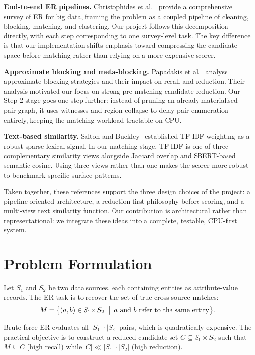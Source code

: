 \documentclass[10pt,twocolumn]{article}
\begin{document}
\textbf{End-to-end ER pipelines.}
Christophides et al.~\cite{christophides2021survey} provide a comprehensive
survey of ER for big data, framing the problem as a coupled pipeline of
cleaning, blocking, matching, and clustering. Our project follows this
decomposition directly, with each step corresponding to one
survey-level task. The key difference is that our implementation shifts
emphasis toward compressing the candidate space before matching rather than
relying on a more expensive scorer.

\textbf{Approximate blocking and meta-blocking.}
Papadakis et al.~\cite{papadakis2016blocking} analyse approximate blocking
strategies and their impact on recall and reduction. Their analysis motivated
our focus on strong pre-matching candidate reduction. Our Step 2 stage goes
one step further: instead of pruning an already-materialised pair graph, it
uses witnesses and region collapse to delay pair enumeration entirely, keeping
the matching workload tractable on CPU.

\textbf{Text-based similarity.}
Salton and Buckley~\cite{salton1988term} established TF-IDF weighting as a
robust sparse lexical signal. In our matching stage, TF-IDF is one of three
complementary similarity views alongside Jaccard overlap and SBERT-based
semantic cosine. Using three views rather than one makes the scorer more
robust to benchmark-specific surface patterns.

Taken together, these references support the three design choices of the
project: a pipeline-oriented architecture, a reduction-first philosophy before
scoring, and a multi-view text similarity function. Our contribution is
architectural rather than representational: we integrate these ideas into a
complete, testable, CPU-first system.

\section{Problem Formulation}

Let $S_1$ and $S_2$ be two data sources, each containing entities as
attribute-value records. The ER task is to recover the set of true
cross-source matches:
\[
  M = \bigl\{(a,b)\in S_1\!\times\! S_2 \;\bigm|\;
      a \text{ and } b \text{ refer to the same entity}\bigr\}.
\]

Brute-force ER evaluates all $|S_1|\cdot|S_2|$ pairs, which is
quadratically expensive. The practical objective is to construct a reduced
candidate set $C \subseteq S_1 \times S_2$ such that $M \subseteq C$ (high
recall) while $|C| \ll |S_1|\cdot|S_2|$ (high reduction).
\end{document}
